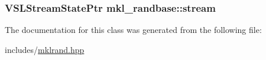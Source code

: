 \subsubsection[{\texorpdfstring{stream}{stream}}]{\setlength{\rightskip}{0pt plus 5cm}V\+S\+L\+Stream\+State\+Ptr mkl\+\_\+randbase\+::stream\hspace{0.3cm}{\ttfamily [protected]}}\hypertarget{classmkl__randbase_a130663e1e2c17ec4a7b77b3c2a6aa1d6}{}\label{classmkl__randbase_a130663e1e2c17ec4a7b77b3c2a6aa1d6}


The documentation for this class was generated from the following file\+:\begin{DoxyCompactItemize}
\item 
includes/\hyperlink{mklrand_8hpp}{mklrand.\+hpp}\end{DoxyCompactItemize}
